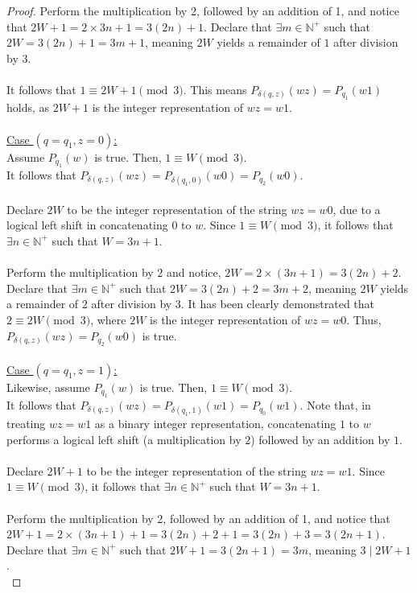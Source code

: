 \documentclass[12pt]{article}
\begin{document}
\begin{proof}
    Perform the multiplication by 2, followed by an addition of 1, and notice that $2W + 1 = 2 \times 3n + 1 = 3(2n) + 1$. Declare that $\exists m \in \mathbb{N}^+$ such that $2W = 3(2n) + 1 = 3m + 1$, meaning $2W$ yields a remainder of $1$ after division by $3$. \\
    \\
    It follows that $1 \equiv 2W + 1 \pmod{3}$. This means $P_{\delta(q, z)}(wz) = P_{q_1}(w1)$ holds, as $2W + 1$ is the integer representation of $wz = w1$. \\
    \\
    \underline{Case $(q = q_1, z = 0)$:} \\
    Assume $P_{q_1}(w)$ is true. Then, $1 \equiv W \pmod{3}$. \\
    It follows that $P_{\delta(q, z)}(wz) = P_{\delta(q_1, 0)}(w0) = P_{q_2}(w0)$. \\
    \\
    Declare $2W$ to be the integer representation of the string $wz = w0$, due to a logical left shift in concatenating $0$ to $w$. Since $1 \equiv W \pmod{3}$, it follows that $\exists n \in \mathbb{N}^+$ such that $W = 3n + 1$. \\
    \\
    Perform the multiplication by $2$ and notice, $2W = 2 \times (3n + 1) = 3(2n) + 2$. Declare that $\exists m \in \mathbb{N}^+$ such that $2W = 3(2n) + 2 = 3m + 2$, meaning $2W$ yields a remainder of $2$ after division by $3$. It has been clearly demonstrated that $2 \equiv 2W \pmod{3}$, where $2W$ is the integer representation of $wz = w0$. Thus, $P_{\delta(q, z)}(wz) = P_{q_2}(w0)$ is true. \\
    \\
    \underline{Case $(q = q_1, z = 1)$:} \\
    Likewise, assume $P_{q_1}(w)$ is true. Then, $1 \equiv W \pmod{3}$. \\
    It follows that $P_{\delta(q, z)}(wz) = P_{\delta(q_1, 1)}(w1) = P_{q_0}(w1)$. Note that, in treating $wz = w1$ as a binary integer representation, concatenating $1$ to $w$ performs a logical left shift (a multiplication by 2) followed by an addition by $1$. \\
    \\
    Declare $2W + 1$ to be the integer representation of the string $wz = w1$. Since $1 \equiv W \pmod{3}$, it follows that $\exists n \in \mathbb{N}^+$ such that $W = 3n + 1$. \\
    \\
    Perform the multiplication by 2, followed by an addition of 1, and notice that $2W + 1 = 2 \times (3n + 1) + 1 = 3(2n) + 2 + 1 = 3(2n) + 3 = 3(2n + 1)$. Declare that $\exists m \in \mathbb{N}^+$ such that $2W + 1 = 3(2n + 1) = 3m$, meaning $3 \mid 2W + 1$. \\

\end{proof}
\end{document}
